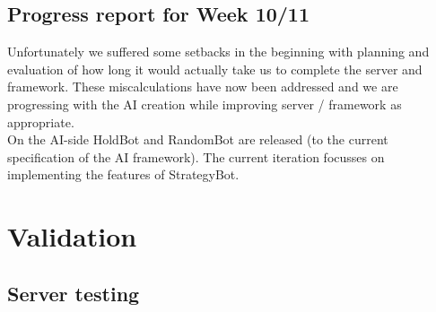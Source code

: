 \documentclass[pdftex,12pt,a4paper]{report}
\begin{document}
\subsection{Progress report for Week 10/11}
Unfortunately we suffered some setbacks in the beginning with planning
and evaluation of how long it would actually take us to complete the
server and framework. These miscalculations have now been addressed
and we are progressing with the AI creation while improving server /
framework as appropriate.  \\ On the AI-side HoldBot and RandomBot are
released (to the current specification of the AI framework). The
current iteration focusses on implementing the features of
StrategyBot.


\section{Validation}

\subsection{Server testing}
\end{document}
